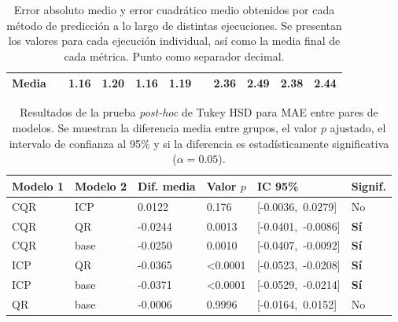 \begin{table}[h]
\begin{tabular}{clcccclcccc}
    Media                            &  & 1.16          & 1.20         & 1.16        & 1.19         &  & 2.36          & 2.49         & 2.38        & 2.44         \\ 
    \bottomrule
    \end{tabular}
    \caption[
        Error absoluto medio y error cuadrático medio obtenidos por cada método de predicción a lo 
        largo de distintas ejecuciones.
    ]{
        Error absoluto medio y error cuadrático medio obtenidos por cada método de predicción a lo 
        largo de distintas ejecuciones. Se presentan los valores para cada ejecución individual, así como la 
        media final de cada métrica.
        Punto como separador decimal.
    }
    \label{tab:AE_MAE_MSE_comparative}
\end{table}

\renewcommand{\arraystretch}{1.2}
\begin{table}[h]
    \small
    \centering
    \begin{tabular}{llllll}
    \toprule
    \textbf{Modelo 1} & \textbf{Modelo 2} & \textbf{Dif. media} & \textbf{Valor $p$} & \textbf{IC 95\%} & \textbf{Signif.} \\
    \midrule
    CQR  & ICP   & 0.0122 & 0.176  & [-0.0036,\ 0.0279] & No  \\
    CQR  & QR    & -0.0244 & 0.0013 & [-0.0401,\ -0.0086] & \textbf{Sí} \\
    CQR  & base  & -0.0250 & 0.0010 & [-0.0407,\ -0.0092] & \textbf{Sí} \\
    ICP  & QR    & -0.0365 & \textless 0.0001 & [-0.0523,\ -0.0208] & \textbf{Sí} \\
    ICP  & base  & -0.0371 & \textless 0.0001 & [-0.0529,\ -0.0214] & \textbf{Sí} \\
    QR   & base  & -0.0006 & 0.9996 & [-0.0164,\ 0.0152] & No \\
    \bottomrule
    \end{tabular}
    \caption[
        Resultados de la prueba \textit{post-hoc} de Tukey HSD para MAE entre pares de modelos.
    ]{
        Resultados de la prueba \textit{post-hoc} de Tukey HSD para MAE entre pares de modelos. Se muestran 
        la diferencia media entre grupos, el valor $p$ ajustado, el intervalo de confianza al 95\% y si la 
        diferencia es estadísticamente significativa ($\alpha = 0.05$).
    }
    \label{tab:AE_tukey_mae}
\end{table}

